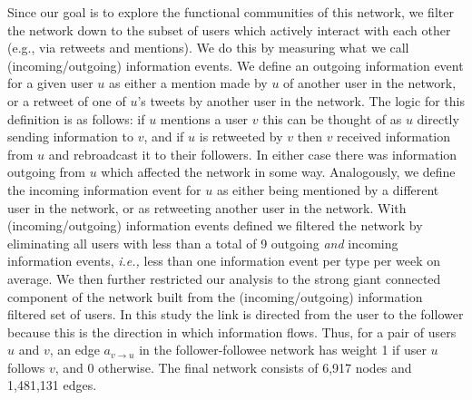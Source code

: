 Since our goal is to explore the functional communities of this network, we filter the network down to the subset of users which actively interact with each other (e.g., via retweets and mentions). We do this by measuring what we call (incoming/outgoing) information events. We define an outgoing information event for a given user $u$ as either a mention made by $u$ of another user in the network, or a retweet of one of $u$'s tweets by another user in the network. The logic for this definition is as follows: if $u$ mentions a user $v$ this can be thought of as $u$ directly sending information to $v$, and if $u$ is retweeted by $v$ then $v$ received information from $u$ and rebroadcast it to their followers. In either case there was information outgoing from $u$ which affected the network in some way. Analogously, we define the incoming information event for $u$ as either being mentioned by a different user in the network, or as retweeting another user in the network.
With (incoming/outgoing) information events defined we filtered the network by eliminating all users with less than a total of 9 outgoing \emph{and} incoming information events, {\it i.e.,} less than one information event per type per week on average. 
We then further restricted our analysis to the strong giant connected component of the network built from the (incoming/outgoing) information filtered set of users. %
In this study the link is directed from the user to the follower because this is the direction in which information flows. Thus, for a pair of users $u$ and $v$, an edge $a_{v \to u}$ in the follower-followee network has weight 1 if user $u$ follows $v$, and 0 otherwise. The final network consists of 6,917 nodes and 1,481,131 edges.

